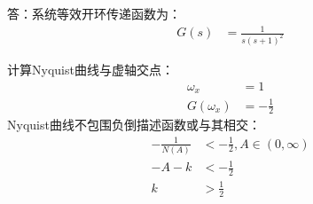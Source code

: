\onlyanswer
{
答：系统等效开环传递函数为：
\begin{align*}
G(s) &=\frac{1}{s(s+1)^2}
\end{align*}

计算Nyquist曲线与虚轴交点：
\begin{align*}
\omega_x &=1 \\
G(\omega_x) &= -\frac{1}{2}
\end{align*}
Nyquist曲线不包围负倒描述函数或与其相交：
\begin{align*}
-\frac{1}{N(A)} &< -\frac{1}{2} ,A\in(0,\infty)\\
-A-k&<-\frac{1}{2}\\
k &>\frac{1}{2}
\end{align*}
}
